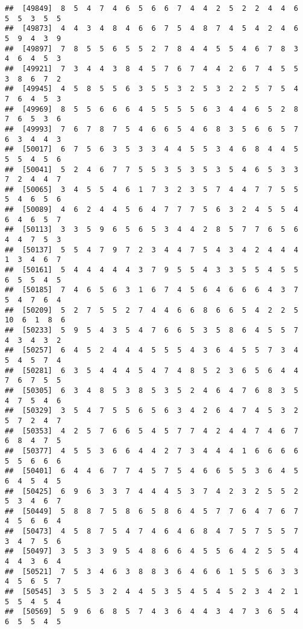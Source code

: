 \documentclass[
]{book}
\begin{document}
\begin{verbatim}
##  [49849]  8  5  4  7  4  6  5  6  6  7  4  4  2  5  2  2  4  4  6  5  5  3  5  5
##  [49873]  4  4  3  4  8  4  6  6  7  5  4  8  7  4  5  4  2  4  6  5  9  4  3  9
##  [49897]  7  8  5  5  6  5  5  2  7  8  4  4  5  5  4  6  7  8  3  4  6  4  5  3
##  [49921]  7  3  4  4  3  8  4  5  7  6  7  4  4  2  6  7  4  5  5  3  8  6  7  2
##  [49945]  4  5  8  5  5  6  3  5  5  3  2  5  3  2  2  5  7  5  4  7  6  4  5  3
##  [49969]  8  5  5  6  6  6  4  5  5  5  5  6  3  4  4  6  5  2  8  7  6  5  3  6
##  [49993]  7  6  7  8  7  5  4  6  6  5  4  6  8  3  5  6  6  5  7  6  3  4  4  3
##  [50017]  6  7  5  6  3  5  3  3  4  4  5  5  3  4  6  8  4  4  5  5  5  4  5  6
##  [50041]  5  2  4  6  7  7  5  5  3  5  3  5  3  5  4  6  5  3  3  7  2  4  4  7
##  [50065]  3  4  5  5  4  6  1  7  3  2  3  5  7  4  4  7  7  5  5  5  4  6  5  6
##  [50089]  4  6  2  4  4  5  6  4  7  7  7  5  6  3  2  4  5  5  4  6  4  6  5  7
##  [50113]  3  3  5  9  6  5  6  5  3  4  4  2  8  5  7  7  6  5  6  4  4  7  5  3
##  [50137]  5  5  4  7  9  7  2  3  4  4  7  5  4  3  4  2  4  4  4  1  3  4  6  7
##  [50161]  5  4  4  4  4  4  3  7  9  5  5  4  3  3  5  5  4  5  5  6  5  5  4  5
##  [50185]  7  4  6  5  6  3  1  6  7  4  5  6  4  6  6  6  4  3  7  5  4  7  6  4
##  [50209]  5  2  7  5  5  2  7  4  4  6  6  8  6  6  5  4  2  2  5 10  6  1  8  6
##  [50233]  5  9  5  4  3  5  4  7  6  6  5  3  5  8  6  4  5  5  7  4  3  4  3  2
##  [50257]  6  4  5  2  4  4  4  5  5  5  4  3  6  4  5  5  7  3  4  5  4  5  7  4
##  [50281]  6  3  5  4  4  4  5  4  7  4  8  5  2  3  6  5  6  4  4  7  6  7  5  5
##  [50305]  6  3  4  8  5  3  8  5  3  5  2  4  6  4  7  6  8  3  5  4  7  5  4  6
##  [50329]  3  5  4  7  5  5  6  5  6  3  4  2  6  4  7  4  5  3  2  5  7  2  4  7
##  [50353]  4  2  5  7  6  6  5  4  5  7  7  4  2  4  4  7  4  6  7  6  8  4  7  5
##  [50377]  4  5  5  3  6  6  4  4  2  7  3  4  4  4  1  6  6  6  6  5  5  6  6  6
##  [50401]  6  4  4  6  7  7  4  5  7  5  4  6  6  5  5  3  6  4  5  6  4  5  4  5
##  [50425]  6  9  6  3  3  7  4  4  4  5  3  7  4  2  3  2  5  5  2  5  3  4  6  7
##  [50449]  5  8  8  7  5  8  6  5  8  6  4  5  7  7  6  4  7  6  7  4  5  6  6  4
##  [50473]  4  5  8  7  5  4  7  4  6  4  6  8  4  7  5  7  5  5  7  3  4  7  5  6
##  [50497]  3  5  3  3  9  5  4  8  6  6  4  5  5  6  4  2  5  5  4  4  4  3  6  4
##  [50521]  7  5  3  4  6  3  8  8  3  6  4  6  6  1  5  5  6  3  3  4  5  6  5  7
##  [50545]  3  5  5  3  2  4  4  5  3  5  4  5  4  5  2  3  4  2  1  5  5  4  5  4
##  [50569]  5  9  6  6  8  5  7  4  3  6  4  4  3  4  7  3  6  5  4  6  5  5  4  5

\end{verbatim}
\end{document}
